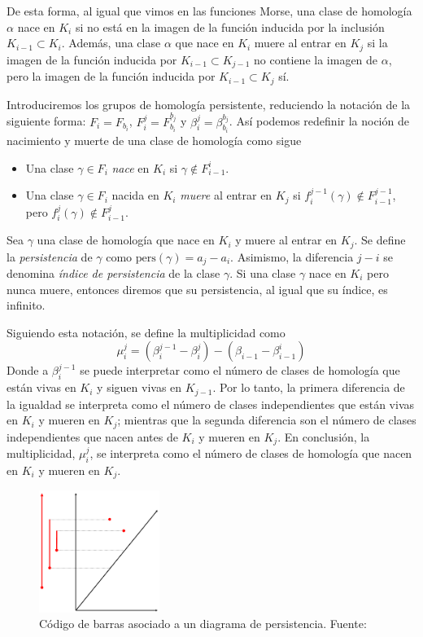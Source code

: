 De esta forma, al igual que vimos en las funciones Morse, una clase de homología $\alpha$ nace en $K_i$ si no está en la imagen de la función inducida por la inclusión $K_{i-1} \subset K_i$. Además, una clase $\alpha$ que nace en $K_i$ muere al entrar en $K_j$ si la imagen de la función inducida por $K_{i-1} \subset K_{j-1}$ no contiene la imagen de $\alpha$, pero la imagen de la función inducida por $K_{i-1} \subset K_j$ sí.

Introduciremos los grupos de homología persistente, reduciendo la notación de la siguiente forma: $F_i = F_{b_i}$, $F_{i}^{j}=F_{b_i}^{b_j}$ y $\beta_{i}^{j}=\beta_{b_i}^{b_j}$. Así podemos redefinir la noción de nacimiento y muerte de una clase de homología como sigue
\begin{itemize}
	\item Una clase $\gamma \in F_i$ \emph{nace} en $K_i$ si $\gamma \notin F_{i-1}^{i}$.
	\item Una clase $\gamma \in F_i$ nacida en $K_i$ \emph{muere} al entrar en $K_j$ si $f_{i}^{j-1}(\gamma)\notin F_{i-1}^{j-1}$, pero $f_{i}^{j}(\gamma)\notin F_{i-1}^{j}$. 
\end{itemize} 

\begin{definition}
Sea $\gamma$ una clase de homología que nace en $K_i$ y muere al entrar en $K_j$. Se define la \emph{persistencia} de $\gamma$ como $\text{pers}(\gamma)= a_j - a_i$. Asimismo, la diferencia $j-i$ se denomina \emph{índice de persistencia} de la clase $\gamma$. Si una clase $\gamma$ nace en $K_i$ pero nunca muere, entonces diremos que su persistencia, al igual que su índice, es infinito.
\end{definition}

Siguiendo esta notación, se define la multiplicidad como
\[
\mu_{i}^{j} = (\beta_{i}^{j-1}-\beta_{i}^{j})-(\beta_{i-1}-\beta_{i-1}^{i})
\]
Donde a $\beta_{i}^{j-1}$ se puede interpretar como el número de clases de homología que están vivas en $K_i$ y siguen vivas en $K_{j-1}$. Por lo tanto, la primera diferencia de la igualdad se interpreta como el número de clases independientes que están vivas en $K_i$ y mueren en $K_j$; mientras que la segunda diferencia son el número de clases independientes que nacen antes de $K_i$ y mueren en $K_j$. En conclusión, la multiplicidad, $\mu_{i}^{j}$, se interpreta como el número de clases de homología que nacen en $K_i$ y mueren en $K_j$.

\begin{figure}[!ht]
\centering
\includegraphics[width=0.35\textwidth]{include/figuras/The-Persistence-Diagram-Associated-to-a-Barcode.png} 
\caption{Código de barras asociado a un diagrama de persistencia. Fuente: \cite{articuloJustin}}
\label{ref:codigoBarras}
\end{figure}

